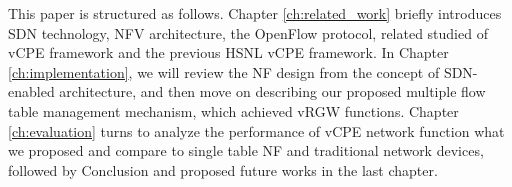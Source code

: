 This paper is structured as follows.
Chapter \ref{ch:related_work} briefly introduces SDN technology, NFV architecture, the OpenFlow protocol, related studied of vCPE framework and the previous HSNL vCPE framework.
In Chapter \ref{ch:implementation}, we will review the NF design from the concept of SDN-enabled \cite{sdn-enabled} architecture, and then move on describing our proposed multiple flow table management mechanism, which achieved vRGW functions.
Chapter \ref{ch:evaluation} turns to analyze the performance of vCPE network function what we proposed and compare to single table NF and traditional network devices, followed by Conclusion and proposed future works in the last chapter.
